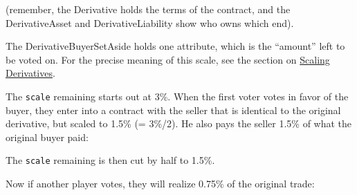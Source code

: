 \documentclass[a4]{article}
\begin{document}
(remember, the Derivative holds the terms of the contract, and the
DerivativeAsset and DerivativeLiability show who owns which end).

The DerivativeBuyerSetAside holds one attribute, which is the ``amount'' left to
be voted on. For the precise meaning of this scale, see the section on \hyperref[scaling-derivatives]{Scaling
Derivatives}.

The \texttt{scale} remaining starts out at 3\%. When the first voter votes in favor
of the buyer, they enter into a contract with the seller that is identical to
the original derivative, but scaled to 1.5\% (= 3\%/2). He also pays the seller
1.5\% of what the original buyer paid:
\begin{figure}
\noindent{}
\end{figure}

The \texttt{scale} remaining is then cut by half to 1.5\%.

Now if another player votes, they will realize 0.75\% of the original trade:
\begin{figure}
\noindent{}
\end{figure}
\end{document}
